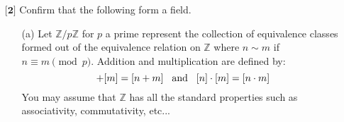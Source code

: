 \documentclass[12pt]{article}
\begin{document}
\begin{itemize}
\begin{itemize}
\begin{proof}
        Associativity: Let $\overline{w}, \overline{v}, \text{ and } \overline{z}$ be arbitrary strings from Free$(\mathcal{S})$, we can see,
        \[\overline{w} + (\overline{v} + \overline{z}) = \overline{w} + \overline{vz} = \overline{wvz} = \overline{wv} + \overline{z} = (\overline{w} + \overline{v}) + \overline{z}\]
    
        Inverses: Let $\overline{w}$ be a string from Free$(\mathcal{S})$. The inverse of $\overline{w}$ will simply be the inverse of each character $(a \to a^{-1})$ in reverse order. 
    
        $\overline{w}$ is composed of characters, we can write it out as \[\overline{w} = w_0 w_1 \dots w_n.\] Meaning the inverse of $\overline{w}$ will be of the form \[w_n^{-1}w_{n-1}^{-1}\dots w_0^{-1}.\] Thus,
        \begin{align*}
            \overline{w} + \overline{w}^{-1}  &= w_0 w_1 \dots w_n + w_n^{-1}w_{n-1}^{-1}\dots w_0^{-1} \\
            &= w_0 w_1 \dots w_n w_n^{-1}w_{n-1}^{-1}\dots w_0^{-1} \\
            &= w_0 w_1 \dots w_{n-1}w_{n-1}^{-1}\dots w_0^{-1} \\ 
            &\vdots \\
            &= w_0 w_0^{-1} \\
            &= e
        \end{align*}
    
        We know this inverse exists since Free$(\mathcal{S})$ is the collection of all finite strings from $\mathcal{S}$
    \end{proof}
    
    \end{itemize}
    
    \vspace{.5cm}
    
    \item[$\textbf{[2]}$]
    Confirm that the following form a field.
    \begin{itemize}
    
    \vspace{.3cm}
    \item[(a)]
    Let $\mathbb{Z}/p\mathbb{Z}$ for $p$ a prime represent the collection of equivalence classes formed out of the equivalence relation on $\mathbb{Z}$ where $n \sim m$ if $n \equiv m \pmod{p}$. Addition and multiplication are defined by:
    \begin{equation*}
    [n] + [m] = [n + m] \hspace{.3cm} \text{and} \hspace{.3cm} [n] \cdot [m] = [n \cdot m]
    \end{equation*}
    You may assume that $\mathbb{Z}$ has all the standard properties such as associativity, commutativity, etc...
    

\end{itemize}
\end{itemize}
\end{document}
